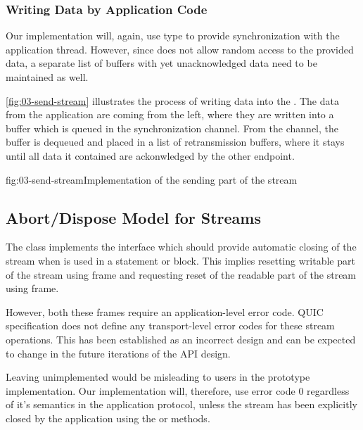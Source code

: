 \subsubsection{Writing Data by Application Code}

Our implementation will, again, use  type to provide synchronization with the
application thread. However, since  does not allow random access to the provided
data, a separate list of buffers with yet unacknowledged data need to be maintained as well.

\autoref{fig:03-send-stream} illustrates the process of writing data into the \SendStream{}. The
data from the application are coming from the left, where they are written into a buffer which is
queued in the synchronization channel. From the channel, the buffer is dequeued and placed in a list
of retransmission buffers, where it stays until all data it contained are ackonwledged by the other
endpoint.


\begin{myFigure}{fig:03-send-stream}{Implementation of the sending part of the stream}

  \resizebox{\linewidth}{!}{}

\end{myFigure}


\subsection{Abort/Dispose Model for Streams}

The \QuicStream{} class implements the  interface which should provide
automatic closing of the stream when \QuicStream{} is used in a  statement or
 block. This implies resetting writable part of the stream using \RESETSTREAM{} frame
and requesting reset of the readable part of the stream using \STOPSENDING{} frame.

However, both these frames require an application-level error code. QUIC specification does not
define any transport-level error codes for these stream operations. This has been established as an
incorrect design and can be expected to change in the future iterations of the API design.

Leaving  unimplemented would be misleading to users in the prototype
implementation. Our implementation will, therefore, use error code 0 regardless of it's semantics in
the application protocol, unless the stream has been explicitly closed by the application using the
 or  methods.


